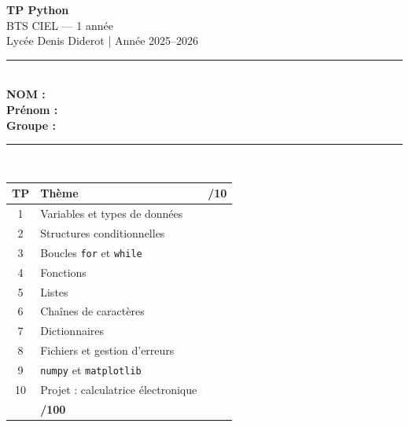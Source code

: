 \documentclass[10pt,a4paper]{article}
\renewcommand{\arraystretch}{1.8}
\begin{document}

\thispagestyle{empty}
\begin{center}
  \vspace*{1.5cm}
  {\Huge\bfseries TP Python}\\[0.4cm]
  {\Large BTS CIEL --- 1\iere{} année}\\[0.3cm]
  {\large Lycée Denis Diderot \quad | \quad Année 2025--2026}\\[2cm]
  \rule{12cm}{0.8pt}\\[0.8cm]
  {\large\bfseries NOM : \underline{\hspace{6cm}}}\\[0.7cm]
  {\large\bfseries Prénom : \underline{\hspace{5.5cm}}}\\[0.7cm]
  {\large\bfseries Groupe : \underline{\hspace{5.6cm}}}\\[1.2cm]
  \rule{12cm}{0.8pt}\\[1.2cm]
  {\renewcommand{\arraystretch}{1.4}
  \begin{tabular}{|c|l|c|}
    \hline
    \rowcolor{tphdr!25}
    \textbf{TP} & \textbf{Thème} & \textbf{/10} \\ \hline
    1  & Variables et types de données           & \\ \hline
    2  & Structures conditionnelles              & \\ \hline
    3  & Boucles \texttt{for} et \texttt{while}  & \\ \hline
    4  & Fonctions                               & \\ \hline
    5  & Listes                                  & \\ \hline
    6  & Chaînes de caractères                   & \\ \hline
    7  & Dictionnaires                           & \\ \hline
    8  & Fichiers et gestion d'erreurs           & \\ \hline
    9  & \texttt{numpy} et \texttt{matplotlib}   & \\ \hline
    10 & Projet : calculatrice électronique      & \\ \hline
    \rowcolor{gray!20}
    \multicolumn{2}{|r|}{\textbf{Total}} & \textbf{/100} \\ \hline
  \end{tabular}}
\end{center}
\end{document}
